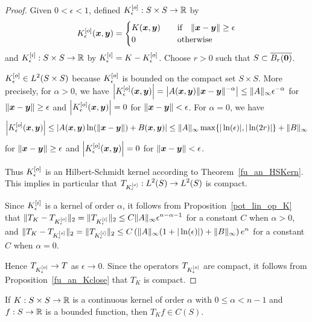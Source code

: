 \begin{proof}
Given $0 < \epsilon <1$, defined
$\displaystyle K_\epsilon^{[o]}:S\times S \rightarrow \mathbb{R}$
by
\[
K_\epsilon^{[o]}({\bm{x}},{\bm{y}}) =
\begin{cases}
K({\bm{x}},{\bm{y}}) & \quad \text{if} \quad 
\|{\bm{x}}-{\bm{y}}\| \geq \epsilon \\
0 & \quad \text{otherwise}
\end{cases}
\]
and $\displaystyle K_\epsilon^{[i]}:S\times S \rightarrow \mathbb{R}$ by
$\displaystyle K_\epsilon^{[i]} = K - K_\epsilon^{[o]}$.  Choose $r>0$
such that $S \subset \overline{B_r({\bm{0}})}$.

 $\displaystyle K_\epsilon^{[o]} \in L^2(S \times S)$ because
$\displaystyle K_\epsilon^{[o]}$ is bounded on the compact set $S \times S$.
More precisely, for $\alpha>0$, we have
$\displaystyle
\left|K_\epsilon^{[o]}({\bm{x}},{\bm{y}})\right| =
\left| A({\bm{x}},{\bm{y}}) \|{\bm{x}} - {\bm{y}} \|^{-\alpha} \right|
\leq \|A\|_{\infty} \epsilon^{-\alpha}$
for $\|{\bm{x}}-{\bm{y}}\| \geq \epsilon$ and
$\displaystyle \left|K_\epsilon^{[o]}({\bm{x}},{\bm{y}})\right| = 0$
for $\|{\bm{x}}-{\bm{y}}\| < \epsilon$.
For $\alpha = 0$, we have
\[
\left|K_\epsilon^{[o]}({\bm{x}},{\bm{y}})\right|
\leq
\left| A({\bm{x}},{\bm{y}}) \ln(\|{\bm{x}} - {\bm{y}} \|) + B({\bm{x}},{\bm{y}})
\right|
\leq \|A\|_{\infty} \max \{ |\ln(\epsilon)|, |\ln(2r)| \} +
\|B\|_\infty
\]
for $\|{\bm{x}}-{\bm{y}}\| \geq \epsilon$ and
$\displaystyle
\left|K_\epsilon^{[o]}({\bm{x}},{\bm{y}})\right| = 0$
for $\|{\bm{x}}-{\bm{y}}\| < \epsilon$.

Thus $\displaystyle K_\epsilon^{[o]}$ is an Hilbert-Schmidt kernel according to
Theorem~\ref{fu_an_HSKern}.  This implies in particular that
$\displaystyle T_{K_\epsilon^{[o]}}:L^2(S) \rightarrow L^2(S)$ is compact.

 Since $\displaystyle K_\epsilon^{[i]}$ is a kernel of order $\alpha$,
it follows from Proposition~\ref{pot_lin_op_K} that
$\displaystyle
\|T_K - T_{K_\epsilon^{[o]}}\|_2 =
\|T_{K_\epsilon^{[i]}}\|_2 \leq C \|A\|_\infty \epsilon^{n-\alpha-1}$
for a constant $C$ when $\alpha>0$, and
$\displaystyle
\|T_K - T_{K_\epsilon^{[o]}}\|_2 =
\|T_{K_\epsilon^{[i]}}\|_2 \leq C \left( \|A\|_\infty
  (1+|\ln(\epsilon)|) + \|B\|_\infty \right) e^{n}$
for a constant $C$ when $\alpha = 0$.

Hence $\displaystyle T_{K_\epsilon^{[o]}} \rightarrow T$ as
$\epsilon \rightarrow 0$.
Since the operators $\displaystyle T_{K_\epsilon^{[o]}}$ are compact,
it follows from Proposition~\ref{fu_an_Kclose} that $T_K$ is compact.
\end{proof}

\begin{prop} \label{pot_Kc_fb}
If $K:S\times S \rightarrow \mathbb{R}$ is a continuous kernel of order
$\alpha$ with $0\leq \alpha < n-1$ and $f:S\rightarrow \mathbb{R}$ is
a bounded function, then $T_K f \in C(S)$.
\end{prop}


